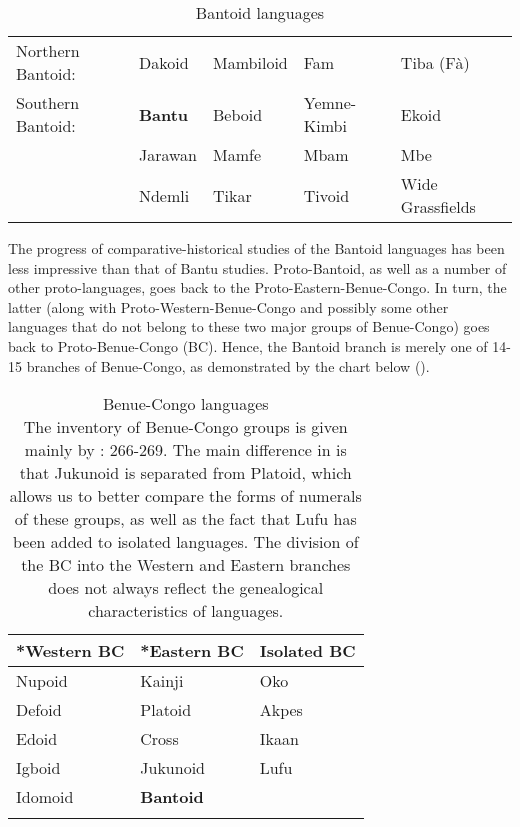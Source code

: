  
\begin{table}
\caption{Bantoid languages}


\label{tab:0.1}
\begin{tabularx}{\textwidth}{Qllll}
{}
Northern Bantoid: & Dakoid & Mambiloid & Fam & Tiba (F{\`{a}})\\
Southern Bantoid: & \textbf{Bantu} & Beboid & Yemne-Kimbi & Ekoid\\
~ & Jarawan & Mamfe & Mbam & Mbe\\
~ & Ndemli & Tikar & Tivoid & Wide Grassfields\\
\end{tabularx}
\end{table}

The progress of comparative-historical studies of the Bantoid languages has been less impressive than that of Bantu studies. Proto-Bantoid, as well as a number of other proto-languages, goes back to the Proto-Eastern-Benue-Congo. In turn, the latter (along with Proto-Western-Benue-Congo and possibly some other languages that do not belong to these two major groups of Benue-Congo) goes back to Proto-Benue-Congo (BC). Hence, the Bantoid branch is merely one of 14-15 branches of Benue-Congo, as demonstrated by the chart below ().

 
\begin{table}[b]
\caption{Benue-Congo languages\\
{The inventory of Benue-Congo groups is given mainly by \citealt{Williamson1989b}: 266-269. The main difference in  is that Jukunoid is separated from Platoid, which allows us to better compare the forms of numerals of these groups, as well as the fact that Lufu has been added to isolated languages. The division of the BC into the Western and Eastern branches does not always reflect the genealogical characteristics of languages.}}
\label{tab:0:2}
\begin{tabularx}{.8\textwidth}{XXl}
\lsptoprule
*Western BC & *Eastern BC & Isolated BC\\
\midrule 
Nupoid & Kainji & Oko\index{Oko!}\\
Defoid & Platoid & Akpes\index{Akpes!} \\
Edoid & Cross & Ikaan\index{Ikaan!}\\
Igboid & Jukunoid & Lufu\index{Lufu!}\\
Idomoid & \textbf{Bantoid} & \\
\lspbottomrule
\end{tabularx}
\end{table}

